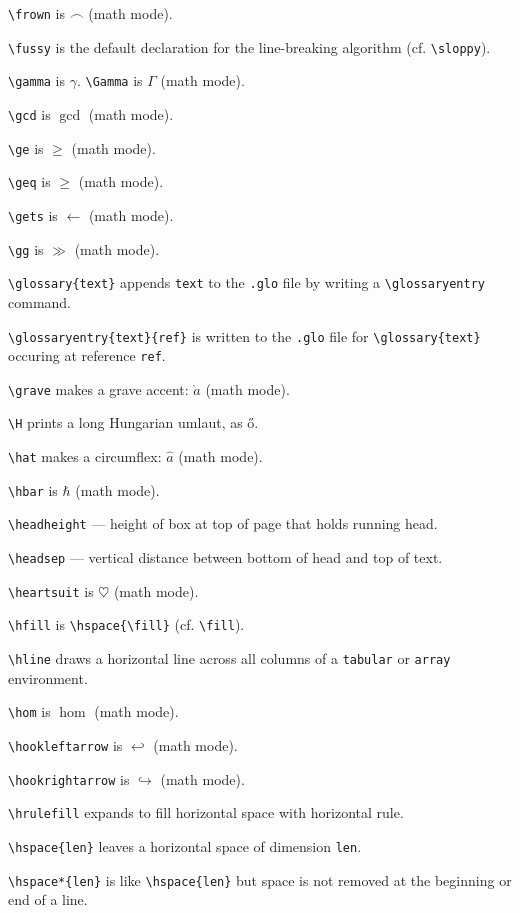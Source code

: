 \verb"\frown" is $\frown$ (math mode).

\verb"\fussy" is the default declaration for the line-breaking algorithm
	(cf. \verb"\sloppy").

\verb"\gamma" is $\gamma$. \verb"\Gamma" is $\Gamma$ (math mode).

\verb"\gcd" is $\gcd$ (math mode).

\verb"\ge" is $\ge$ (math mode).

\verb"\geq" is $\geq$ (math mode).

\verb"\gets" is $\gets$ (math mode).

\verb"\gg" is $\gg$ (math mode).

\verb"\glossary{text}" appends \verb"text" to the \verb".glo" file
	by writing a \verb"\glossaryentry" command.
	
\verb"\glossaryentry{text}{ref}" is written to the \verb".glo" file for
	\verb"\glossary{text}" occuring at reference \verb"ref".

\verb"\grave" makes a grave accent: $\grave a$ (math mode).

\verb"\H" prints a long Hungarian umlaut, as \H o.

\verb"\hat" makes a circumflex: $\hat a$ (math mode).

\verb"\hbar" is $\hbar$ (math mode).

\verb"\headheight" --- height of box at top of page that holds running head.

\verb"\headsep" --- vertical distance between bottom of head and top of text.

\verb"\heartsuit" is $\heartsuit$ (math mode).

\verb"\hfill" is \verb"\hspace{\fill}" (cf. \verb"\fill").

\verb"\hline" draws a horizontal line across all columns of a \verb"tabular"
	or \verb"array" environment.

\verb"\hom" is $\hom$ (math mode).

\verb"\hookleftarrow" is $\hookleftarrow$ (math mode).

\verb"\hookrightarrow" is $\hookrightarrow$ (math mode).

\verb"\hrulefill" expands to fill horizontal space with horizontal rule.

\verb"\hspace{len}" leaves a horizontal space of dimension \verb"len".

\verb"\hspace*{len}" is like \verb"\hspace{len}" but space is not removed at the
	beginning or end of a line.

